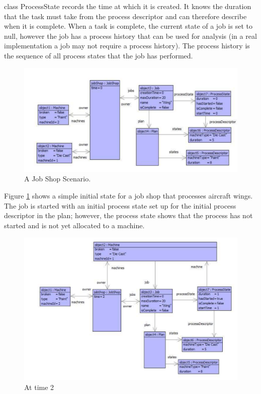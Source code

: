 class ProcessState records the time at which it is created. It knows
the duration that the task must take from the process descriptor and
can therefore describe when it is complete. When a task is complete,
the current state of a job is set to null, however the job has a process
history that can be used for analysis (in a real implementation a
job may not require a process history). The process history is the
sequence of all process states that the job has performed.

%
\begin{figure}
\begin{center}
\includegraphics[width=14cm]{Programming/Simulation/Images/ProcessWing.pdf}

\caption{A Job Shop Scenario. \label{fig:Process-Wing}}

\end{center}
\end{figure}


Figure \ref{fig:Process-Wing} shows a simple initial state for a
job shop that processes aircraft wings. The job is started with an
initial process state set up for the initial process descriptor in
the plan; however, the process state shows that the process has not
started and is not yet allocated to a machine.

%
\begin{figure}
\begin{center}

\includegraphics[width=14cm]{Programming/Simulation/Images/ProcessWing2.pdf}

\caption{At time 2 \label{fig:At-time-2}}

\end{center}
\end{figure}


